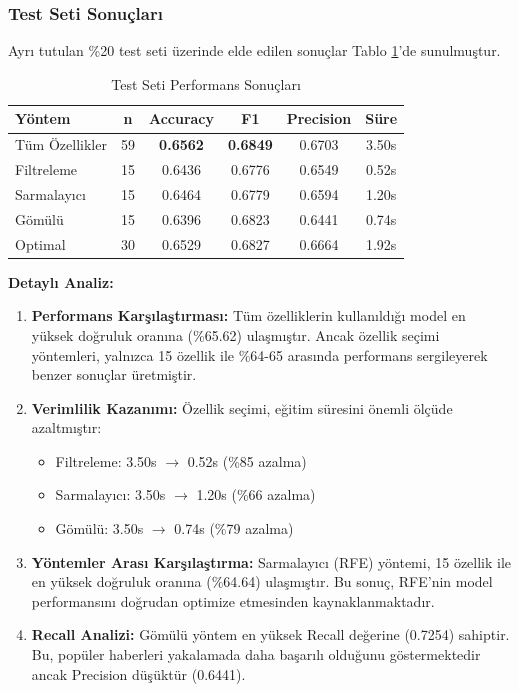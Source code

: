 \documentclass[conference]{IEEEtran}
\begin{document}
\subsubsection{Test Seti Sonuçları}

Ayrı tutulan \%20 test seti üzerinde elde edilen sonuçlar Tablo \ref{tab:test_results}'de sunulmuştur.

\begin{table}[H]
\centering
\caption{Test Seti Performans Sonuçları}
\label{tab:test_results}
\begin{tabular}{lccccc}
\toprule
\textbf{Yöntem} & \textbf{n} & \textbf{Accuracy} & \textbf{F1} & \textbf{Precision} & \textbf{Süre} \\
\midrule
Tüm Özellikler & 59 & \textbf{0.6562} & \textbf{0.6849} & 0.6703 & 3.50s \\
Filtreleme & 15 & 0.6436 & 0.6776 & 0.6549 & 0.52s \\
Sarmalayıcı & 15 & 0.6464 & 0.6779 & 0.6594 & 1.20s \\
Gömülü & 15 & 0.6396 & 0.6823 & 0.6441 & 0.74s \\
Optimal & 30 & 0.6529 & 0.6827 & 0.6664 & 1.92s \\
\bottomrule
\end{tabular}
\end{table}

\textbf{Detaylı Analiz:}

\begin{enumerate}
    \item \textbf{Performans Karşılaştırması:} Tüm özelliklerin kullanıldığı model en yüksek doğruluk oranına (\%65.62) ulaşmıştır. Ancak özellik seçimi yöntemleri, yalnızca 15 özellik ile \%64-65 arasında performans sergileyerek benzer sonuçlar üretmiştir.
    
    \item \textbf{Verimlilik Kazanımı:} Özellik seçimi, eğitim süresini önemli ölçüde azaltmıştır:
    \begin{itemize}
        \item Filtreleme: 3.50s $\rightarrow$ 0.52s (\%85 azalma)
        \item Sarmalayıcı: 3.50s $\rightarrow$ 1.20s (\%66 azalma)
        \item Gömülü: 3.50s $\rightarrow$ 0.74s (\%79 azalma)
    \end{itemize}
    
    \item \textbf{Yöntemler Arası Karşılaştırma:} Sarmalayıcı (RFE) yöntemi, 15 özellik ile en yüksek doğruluk oranına (\%64.64) ulaşmıştır. Bu sonuç, RFE'nin model performansını doğrudan optimize etmesinden kaynaklanmaktadır.
    
    \item \textbf{Recall Analizi:} Gömülü yöntem en yüksek Recall değerine (0.7254) sahiptir. Bu, popüler haberleri yakalamada daha başarılı olduğunu göstermektedir ancak Precision düşüktür (0.6441).
\end{enumerate}
\end{document}
